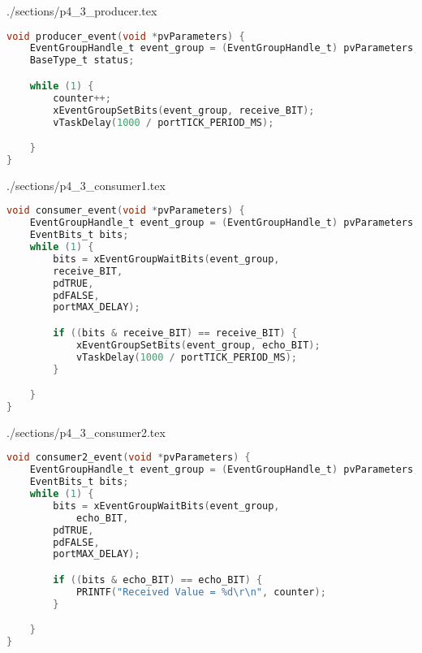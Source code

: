 \begin{filecontents}[overwrite]{./sections/p4_3_producer.tex}
\begin{lstlisting}[language=c,caption=Problem 4.3 Producer Task, label=list:p4_3_prod]
void producer_event(void *pvParameters) {
    EventGroupHandle_t event_group = (EventGroupHandle_t) pvParameters;
    BaseType_t status;

    while (1) {
        counter++;
        xEventGroupSetBits(event_group, receive_BIT);
        vTaskDelay(1000 / portTICK_PERIOD_MS);

    }
}
\end{lstlisting}
\end{filecontents}

\begin{filecontents}[overwrite]{./sections/p4_3_consumer1.tex}
\begin{lstlisting}[language=c,caption=Problem 4.3 Consumer 1 Task, label=list:p4_3_cons1]
void consumer_event(void *pvParameters) {
    EventGroupHandle_t event_group = (EventGroupHandle_t) pvParameters;
    EventBits_t bits;
    while (1) {
        bits = xEventGroupWaitBits(event_group,
        receive_BIT,
        pdTRUE,
        pdFALSE,
        portMAX_DELAY);

        if ((bits & receive_BIT) == receive_BIT) {
            xEventGroupSetBits(event_group, echo_BIT);
            vTaskDelay(1000 / portTICK_PERIOD_MS);
        }

    }
}
\end{lstlisting}
\end{filecontents}

\begin{filecontents}[overwrite]{./sections/p4_3_consumer2.tex}
\begin{lstlisting}[language=c,caption=Problem 4.3 Consumer 2 Task, label=list:p4_3_cons2]
void consumer2_event(void *pvParameters) {
    EventGroupHandle_t event_group = (EventGroupHandle_t) pvParameters;
    EventBits_t bits;
    while (1) {
        bits = xEventGroupWaitBits(event_group,
            echo_BIT,
        pdTRUE,
        pdFALSE,
        portMAX_DELAY);

        if ((bits & echo_BIT) == echo_BIT) {
            PRINTF("Received Value = %d\r\n", counter);
        }

    }
}
\end{lstlisting}
\end{filecontents}

